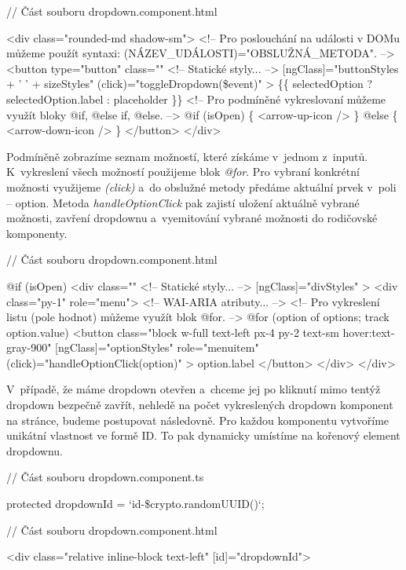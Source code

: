 \begin{prog}
// Část souboru dropdown.component.html

<div class="rounded-md shadow-sm">
  <!-- Pro poslouchání na události v DOMu můžeme 
    použít syntaxi: (NÁZEV_UDÁLOSTI)="OBSLUŽNÁ_METODA". -->
  <button
    type="button"
    class="" <!-- Statické styly... -->
    [ngClass]="buttonStyles + ' ' + sizeStyles"
    (click)="toggleDropdown(\$event)"
  >
    \{\{ selectedOption ? selectedOption.label : placeholder \}\}
    <!-- Pro podmíněné vykreslovaní můžeme využít bloky @if, @else if, @else. -->
    @if (isOpen) \{
      <arrow-up-icon />
    \} @else \{
      <arrow-down-icon />
    \}
  </button>
</div>
\end{prog}

Podmíněně zobrazíme seznam možností, které získáme v~jednom z~inputů. K~vykreslení všech možností použijeme blok \emph{@for}. 
Pro vybraní konkrétní možnosti využijeme \emph{(click)} a~do obslužné metody předáme aktuální prvek v~poli -- option. 
Metoda \emph{handleOptionClick} pak zajistí uložení aktuálně vybrané možnosti, zavření dropdownu a~vyemitování vybrané možnosti do rodičovské komponenty.

\begin{prog}
// Část souboru dropdown.component.html

@if (isOpen) {
  <div
    class="" <!-- Statické styly... -->
    [ngClass]="divStyles"
  >
    <div class="py-1" role="menu"> <!-- WAI-ARIA atributy... -->
      <!-- Pro vykreslení listu (pole hodnot) můžeme využít blok @for. -->
      @for (option of options; track option.value) {
        <button
          class="block w-full text-left px-4 py-2 text-sm hover:text-gray-900"
          [ngClass]="optionStyles"
          role="menuitem"
          (click)="handleOptionClick(option)"
        >
          {{ option.label }}
        </button>
      }
    </div>
  </div>
}
\end{prog}

V~případě, že máme dropdown otevřen a~chceme jej po kliknutí mimo tentýž dropdown bezpečně zavřít, nehledě na počet vykreslených dropdown komponent na stránce, budeme postupovat následovně. 
Pro každou komponentu vytvoříme unikátní vlastnost ve formě ID. To pak dynamicky umístíme na kořenový element dropdownu.

\begin{prog}
// Část souboru dropdown.component.ts

protected dropdownId = `id-\${crypto.randomUUID()}`;

// Část souboru dropdown.component.html

<div class="relative inline-block text-left" [id]="dropdownId">
\end{prog}

